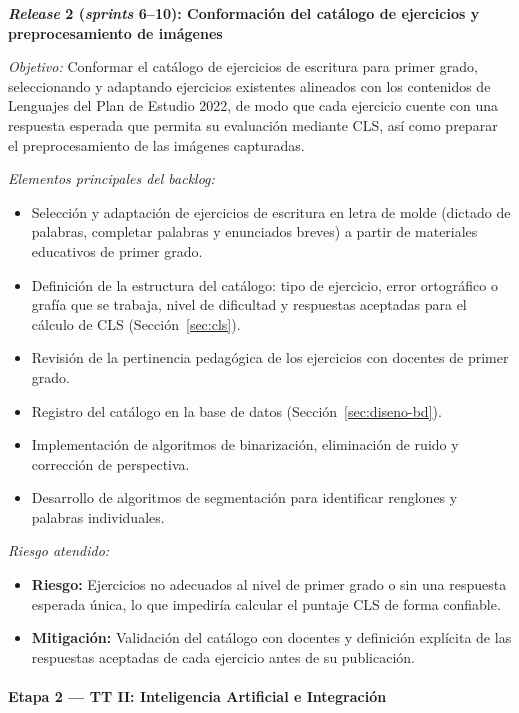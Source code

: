 \textbf{\textit{Release} 2 (\textit{sprints} 6--10): Conformación del catálogo de ejercicios y preprocesamiento de imágenes}

\textit{Objetivo:} Conformar el catálogo de ejercicios de escritura para primer grado,
seleccionando y adaptando ejercicios existentes alineados con los contenidos de
Lenguajes del Plan de Estudio 2022, de modo que cada ejercicio cuente con una respuesta
esperada que permita su evaluación mediante CLS, así como preparar el preprocesamiento
de las imágenes capturadas.

\textit{Elementos principales del backlog:}
\begin{itemize}
    \item Selección y adaptación de ejercicios de escritura en letra de molde (dictado
    de palabras, completar palabras y enunciados breves) a partir de materiales
    educativos de primer grado.
    \item Definición de la estructura del catálogo: tipo de ejercicio, error ortográfico
    o grafía que se trabaja, nivel de dificultad y respuestas aceptadas para el cálculo
    de CLS (Sección~\ref{sec:cls}).
    \item Revisión de la pertinencia pedagógica de los ejercicios con docentes de primer
    grado.
    \item Registro del catálogo en la base de datos (Sección~\ref{sec:diseno-bd}).
    \item Implementación de algoritmos de binarización, eliminación de ruido y
    corrección de perspectiva.
    \item Desarrollo de algoritmos de segmentación para identificar renglones y palabras
    individuales.
\end{itemize}

\textit{Riesgo atendido:}
\begin{itemize}
    \item \textbf{Riesgo:} Ejercicios no adecuados al nivel de primer grado o sin una
    respuesta esperada única, lo que impediría calcular el puntaje CLS de forma confiable.
    \item \textbf{Mitigación:} Validación del catálogo con docentes y definición explícita
    de las respuestas aceptadas de cada ejercicio antes de su publicación.
\end{itemize}

\paragraph{Etapa 2 — TT II: Inteligencia Artificial e Integración}


